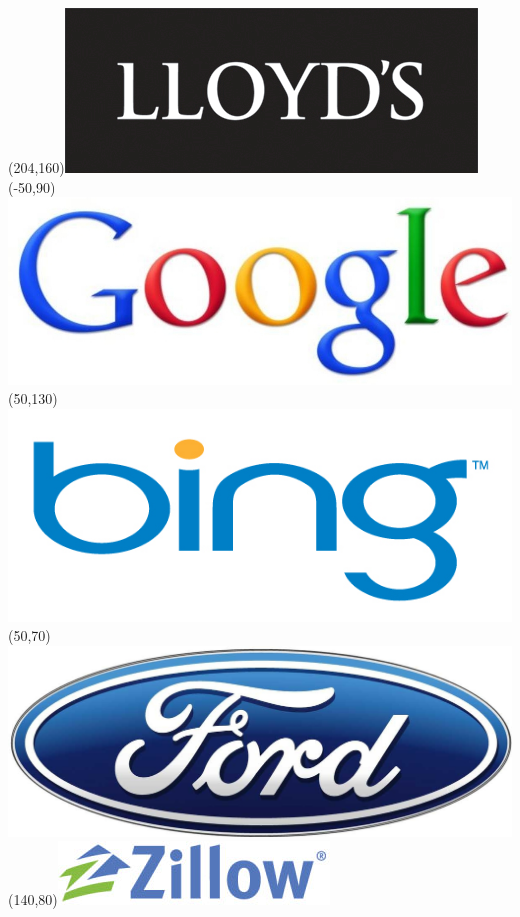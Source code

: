 \begin{frame}
\Put(204,160){\includegraphics[scale=.16]{../common/pics/R_using_logos/lloyds}}
\Put(-50,90){\includegraphics[scale=.12]{../common/pics/R_using_logos/google}}
\Put(50,130){\includegraphics[scale=.12]{../common/pics/R_using_logos/bing}}
\Put(50,70){\includegraphics[scale=.29]{../common/pics/R_using_logos/ford}}
\Put(140,80){\includegraphics[scale=.25]{../common/pics/R_using_logos/zillow}}

\end{frame}
